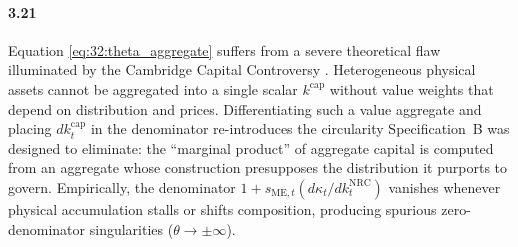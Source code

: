\paragraph{3.21}
Equation \eqref{eq:32:theta_aggregate} suffers from a severe theoretical flaw illuminated by the Cambridge Capital Controversy \citep{Robinson1953, Sraffa1960}. Heterogeneous physical assets cannot be aggregated into a single scalar $k^{\text{cap}}$ without value weights that depend on distribution and prices. Differentiating such a value aggregate and placing $dk^{\text{cap}}_t$ in the denominator re-introduces the circularity Specification~B was designed to eliminate: the ``marginal product'' of aggregate capital is computed from an aggregate whose construction presupposes the distribution it purports to govern. Empirically, the denominator $1 + s_{\text{ME},t}(d\kappa_t / dk^{\text{NRC}}_t)$ vanishes whenever physical accumulation stalls or shifts composition, producing spurious zero-denominator singularities ($\theta \to \pm\infty$).

